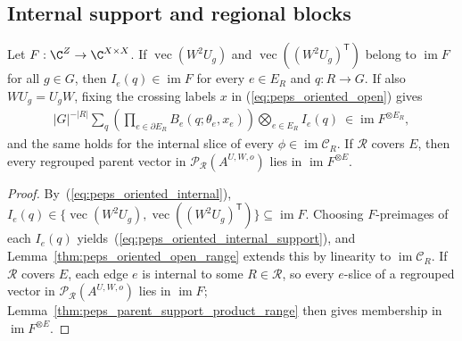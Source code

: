\subsection{Internal support and regional blocks}

\begin{lemma}%
    \label{thm:peps_oriented_parent_support}
    \leanok
    Let $F:\C^Z\to\C^{X\times X}$. If $\operatorname{vec}(W^2U_g)$ and
    $\operatorname{vec}((W^2U_g)^{\mathsf T})$ belong to $\operatorname{im}F$
    for all $g\in G$, then $I_e(q)\in\operatorname{im}F$ for every $e\in E_R$
    and $q:R\to G$. If also $WU_g=U_gW$, fixing the crossing labels $x$ in
    (\ref{eq:peps_oriented_open}) gives
    \begin{align}
        |G|^{-|R|}\sum_q
        \left(\prod_{e\in\partial E_R}B_e(q;\theta_e,x_e)\right)
        \bigotimes_{e\in E_R}I_e(q)
        \ \in\operatorname{im}F^{\otimes E_R},
        \label{eq:peps_oriented_internal_support}
    \end{align}
    and the same holds for the internal slice of every $\phi\in\operatorname{im}\mathcal C_R$.
    If $\mathcal R$ covers $E$, then every regrouped parent vector in
    $\mathcal P_{\mathcal R}(A^{U,W,o})$ lies in $\operatorname{im}F^{\otimes E}$.
\end{lemma}
\begin{proof}\leanok
    By~(\ref{eq:peps_oriented_internal}), $I_e(q)\in\{\operatorname{vec}(W^2U_g),\operatorname{vec}((W^2U_g)^{\mathsf T})\}\subseteq\operatorname{im}F$.
    Choosing $F$-preimages of each $I_e(q)$ yields~(\ref{eq:peps_oriented_internal_support}),
    and Lemma~\ref{thm:peps_oriented_open_range} extends this by linearity to
    $\operatorname{im}\mathcal C_R$. If $\mathcal R$ covers $E$, each edge $e$
    is internal to some $R\in\mathcal R$, so every $e$-slice of a regrouped
    vector in $\mathcal P_{\mathcal R}(A^{U,W,o})$ lies in $\operatorname{im}F$;
    Lemma~\ref{thm:peps_parent_support_product_range} then gives membership
    in $\operatorname{im}F^{\otimes E}$.
\end{proof}


